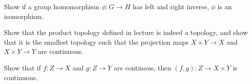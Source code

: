 \documentclass[12pt]{amsart}
\begin{document}
\begin{problem}
Show if a group homomorphism $\phi: G\to H$ has left and right inverse, $\phi$ is an isomorphism.
\end{problem}

\begin{problem}
Show that the product topology defined in lecture is indeed a topology, and show that it is the smallest topology such that the projection maps $X \times Y \to X$ and $X \times Y \to Y$ are continuous.
\end{problem}

\begin{problem}
Show that if $f: Z \to X$ and $g: Z \to Y$ are continous, then $(f,g): Z \to X \times Y$ is continuous.
\end{problem}
\end{document}

